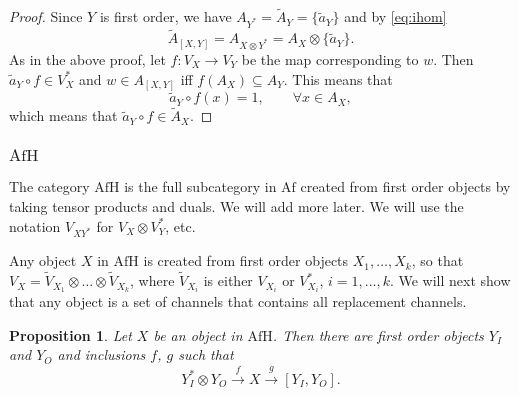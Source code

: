 \documentclass[12pt]{article}
\newtheorem{prop}{Proposition}
\theoremstyle{definition}
\theoremstyle{remark}
\def \Afh{\mathrm{AfH}}
\def \Af{\mathrm{Af}}
\begin{document}
\begin{proof} Since $Y$ is first order, we have $A_{Y^*}=\tilde A_Y=\{\tilde a_Y\}$ and by
\eqref{eq:ihom}
\[
\tilde A_{[X,Y]}=A_{X\otimes Y^*}=A_X\otimes \{\tilde a_Y\}.
\]
As in the above proof, let $f:V_X\to V_Y$ be the map corresponding to $w$. Then $\tilde
a_Y\circ f\in V_X^*$ and $w\in A_{[X,Y]}$ iff $f(A_X)\subseteq A_Y$. This means that
\[
\tilde a_Y\circ f(x)=1,\qquad \forall x\in A_X,
\]
which means that $\tilde a_Y\circ f\in \tilde A_X$.

\end{proof}

\subsubsection{$\Afh$}

The category $\Afh$ is the full subcategory in $\Af$ created from first order objects by
taking tensor products and duals. We will add more later. We will use the notation
$V_{XY^*}$ for $V_X\otimes V^*_Y$, etc. 

Any object $X$ in $\Afh$ is created from first order objects $X_1,\dots, X_k$, so that
$V_X=\tilde V_{X_1}\otimes\dots\otimes \tilde V_{X_k}$, where $\tilde V_{X_i}$ is either
$V_{X_i}$ or $V^*_{X_i}$, $i=1,\dots,k$. We will next show that any object is a set of
channels that contains all replacement channels. 



\begin{prop}\label{prop:afh} Let $X$ be an object in $\Afh$. Then there are  first order
objects $Y_I$ and $Y_O$ and inclusions $f$, $g$ such that
\begin{equation}\label{eq:inclusions}
Y_I^*\otimes Y_O \xrightarrow{f} X\xrightarrow{g} [Y_I,Y_O].
\end{equation}


\end{prop}
\end{document}
